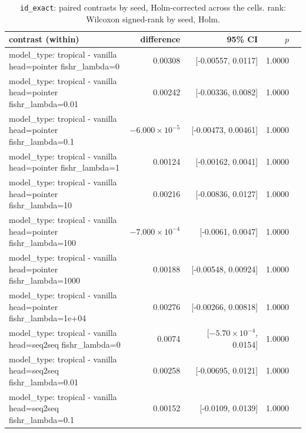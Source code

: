 \documentclass[10pt]{article}
\makeatletter
\newcommand{\stackcell}[1]{\begin{tabular}[t]{@{}l@{}}#1\end{tabular}}
\makeatother
\begin{document}
{\small
\begin{longtable}{lrrrl}
\caption{\texttt{id\_exact}: paired contrasts by seed, Holm-corrected across the cells. rank: Wilcoxon signed-rank by seed, Holm.}\label{tab:paired-id_exact}\\
\toprule
contrast (within) & difference & 95\% CI & $p$ & \\
\midrule
\endhead
\stackcell{model\_type: tropical - vanilla\\\footnotesize head=pointer fishr\_lambda=0 } & 0.00308 & [-0.00557, 0.0117] & 1.0000 & \\
\stackcell{model\_type: tropical - vanilla\\\footnotesize head=pointer fishr\_lambda=0.01 } & 0.00242 & [-0.00336, 0.0082] & 1.0000 & \\
\stackcell{model\_type: tropical - vanilla\\\footnotesize head=pointer fishr\_lambda=0.1 } & $-6.000\times10^{-5}$ & [-0.00473, 0.00461] & 1.0000 & \\
\stackcell{model\_type: tropical - vanilla\\\footnotesize head=pointer fishr\_lambda=1 } & 0.00124 & [-0.00162, 0.0041] & 1.0000 & \\
\stackcell{model\_type: tropical - vanilla\\\footnotesize head=pointer fishr\_lambda=10 } & 0.00216 & [-0.00836, 0.0127] & 1.0000 & \\
\stackcell{model\_type: tropical - vanilla\\\footnotesize head=pointer fishr\_lambda=100 } & $-7.000\times10^{-4}$ & [-0.0061, 0.0047] & 1.0000 & \\
\stackcell{model\_type: tropical - vanilla\\\footnotesize head=pointer fishr\_lambda=1000 } & 0.00188 & [-0.00548, 0.00924] & 1.0000 & \\
\stackcell{model\_type: tropical - vanilla\\\footnotesize head=pointer fishr\_lambda=1e+04 } & 0.00276 & [-0.00266, 0.00818] & 1.0000 & \\
\stackcell{model\_type: tropical - vanilla\\\footnotesize head=seq2seq fishr\_lambda=0 } & 0.0074 & [$-5.70\times10^{-4}$, 0.0154] & 1.0000 & \\
\stackcell{model\_type: tropical - vanilla\\\footnotesize head=seq2seq fishr\_lambda=0.01 } & 0.00258 & [-0.00695, 0.0121] & 1.0000 & \\
\stackcell{model\_type: tropical - vanilla\\\footnotesize head=seq2seq fishr\_lambda=0.1 } & 0.00152 & [-0.0109, 0.0139] & 1.0000 & \\

\end{longtable}}
\end{document}
